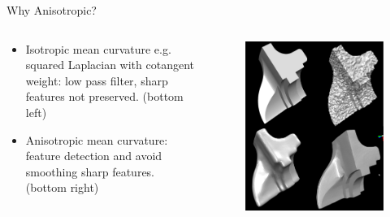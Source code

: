 \documentclass{beamer}
\begin{document}
\begin{frame}{Why Anisotropic?}
\begin{columns}
\begin{column}{0.5\textwidth}
\begin{itemize}
\item Isotropic mean curvature e.g. squared Laplacian with cotangent weight: low pass filter, sharp features not preserved. (bottom left)
\item Anisotropic mean curvature: feature detection and avoid smoothing sharp features. (bottom right)
\end{itemize}
\end{column}
\begin{column}{0.5\textwidth}
\begin{figure}[htb]
\centering
\includegraphics[width=\textwidth]{reason.png}
\label{fig:reason}
\end{figure}
\end{column}
\end{columns}
\end{frame}
\end{document}
